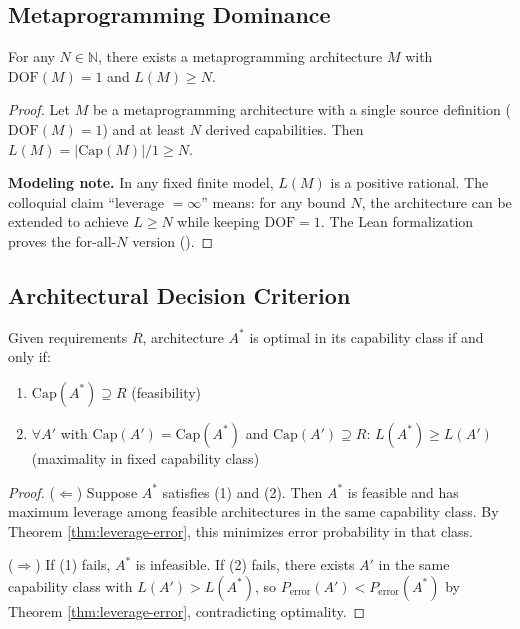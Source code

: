 \subsection{Metaprogramming Dominance}

\begin{theorem}\label{thm:metaprog}
For any $N \in \mathbb{N}$, there exists a metaprogramming architecture $M$ with $\text{DOF}(M) = 1$ and $L(M) \geq N$.
\end{theorem}

\begin{proof}
Let $M$ be a metaprogramming architecture with a single source definition ($\text{DOF}(M) = 1$) and at least $N$ derived capabilities. Then $L(M) = |\text{Cap}(M)|/1 \geq N$.

\textbf{Modeling note.} In any fixed finite model, $L(M)$ is a positive rational. The colloquial claim ``leverage $= \infty$'' means: for any bound $N$, the architecture can be extended to achieve $L \geq N$ while keeping $\text{DOF} = 1$. The Lean formalization proves the for-all-$N$ version ().
\end{proof}

\subsection{Architectural Decision Criterion}

\begin{theorem}\label{thm:optimal}
Given requirements $R$, architecture $A^*$ is optimal in its capability class if and only if:
\begin{enumerate}
\item $\text{Cap}(A^*) \supseteq R$ (feasibility)
\item $\forall A'$ with $\text{Cap}(A') = \text{Cap}(A^*)$ and $\text{Cap}(A') \supseteq R$: $L(A^*) \geq L(A')$ (maximality in fixed capability class)
\end{enumerate}
\end{theorem}

\begin{proof}
($\Leftarrow$) Suppose $A^*$ satisfies (1) and (2). Then $A^*$ is feasible and has maximum leverage among feasible architectures in the same capability class. By Theorem \ref{thm:leverage-error}, this minimizes error probability in that class.

($\Rightarrow$) If (1) fails, $A^*$ is infeasible. If (2) fails, there exists $A'$ in the same capability class with $L(A') > L(A^*)$, so $P_{\text{error}}(A') < P_{\text{error}}(A^*)$ by Theorem \ref{thm:leverage-error}, contradicting optimality.
\end{proof}

